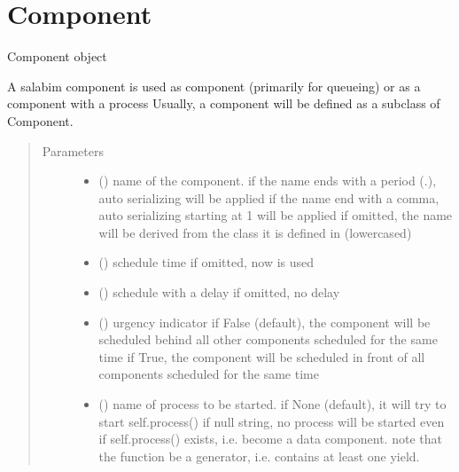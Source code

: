 \documentclass[letterpaper,10pt,english]{sphinxmanual}
\begin{document}
\section{Component}
\label{\detokenize{Reference:component}}

\begin{fulllineitems}
\label{\detokenize{Reference:salabim.Component}}
Component object

A salabim component is used as component (primarily for queueing)
or as a component with a process 
Usually, a component will be defined as a subclass of Component.
\begin{quote}\begin{description}
\item[{Parameters}] \leavevmode\begin{itemize}
\item {} 
 () \textendash{} name of the component. 
if the name ends with a period (.),
auto serializing will be applied 
if the name end with a comma,
auto serializing starting at 1 will be applied 
if omitted, the name will be derived from the class
it is defined in (lowercased)

\item {} 
 () \textendash{} schedule time 
if omitted, now is used

\item {} 
 () \textendash{} schedule with a delay 
if omitted, no delay

\item {} 
 () \textendash{} urgency indicator 
if False (default), the component will be scheduled
behind all other components scheduled
for the same time 
if True, the component will be scheduled
in front of all components scheduled
for the same time

\item {} 
 () \textendash{} name of process to be started. 
if None (default), it will try to start self.process() 
if null string, no process will be started even if self.process() exists,
i.e. become a data component. 
note that the function  be a generator,
i.e. contains at least one yield.


\end{itemize}
\end{description}
\end{quote}
\end{fulllineitems}
\end{document}
